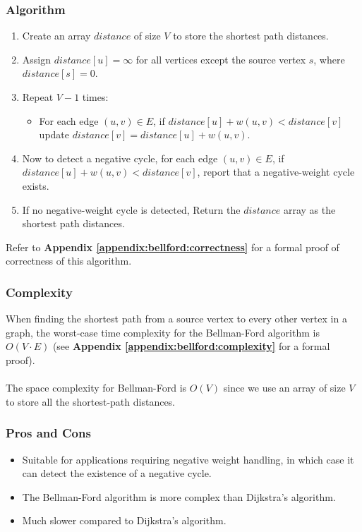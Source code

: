 		\subsubsection{Algorithm}
			\begin{enumerate}
				\item Create an array $distance$ of size $V$ to store the shortest path distances.
				\item Assign $distance[u] = \infty$ for all vertices except the source vertex $s$, where $distance[s] = 0$.
				\item Repeat $V - 1$ times:
					\begin{itemize}
						\item For each edge $(u,v) \in E$, if $distance[u] + w(u,v) < distance[v]$ update $distance[v]=distance[u]+w(u,v)$.
					\end{itemize}
				\item Now to detect a negative cycle, for each edge $(u,v) \in E$, if $distance[u] + w(u,v) < distance[v]$, report that a negative-weight cycle exists.
				\item If no negative-weight cycle is detected, Return the $distance$ array as the shortest path distances.
			\end{enumerate}
			Refer to \textbf{Appendix \ref{appendix:bellford:correctness}} for a formal proof of correctness of this algorithm.
		\subsubsection{Complexity}
			When finding the shortest path from a source vertex to every other vertex in a graph, the worst-case time complexity for the Bellman-Ford algorithm is $O(V \cdot E)$ (see \textbf{Appendix \ref{appendix:bellford:complexity}} for a formal proof). \\ \\
			The space complexity for Bellman-Ford is $O(V)$ since we use an array of size $V$ to store all the shortest-path distances.
		\subsubsection{Pros and Cons}
			\begin{itemize}
				\item Suitable for applications requiring negative weight handling, in which case it can detect the existence of a negative cycle.
				\item The Bellman-Ford algorithm is more complex than Dijkstra's algorithm.
				\item Much slower compared to Dijkstra's algorithm.
			\end{itemize}
